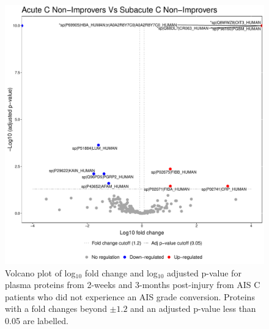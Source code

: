 \documentclass[9pt,lineno]{elife}
\begin{document}
\begin{figure}
\includegraphics[width=1\linewidth]{figures/openms_protein_quantification/label_free/volcano_plots/openms_volcano_plot_2021-08-10_0017} \caption{Volcano plot of log\(_10\) fold change and log\(_10\) adjusted p-value for plasma proteins from 2-weeks and 3-months post-injury from AIS C patients who did not experience an AIS grade conversion. Proteins with a fold changes beyond \(\pm 1.2\) and an adjusted p-value less than 0.05 are labelled.}\label{fig:volc-plot-acute-c-nonimp-vs-subacute-nonimp}
\end{figure}
\end{document}
